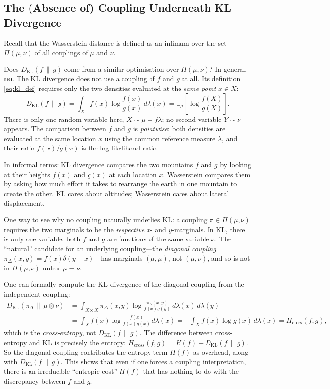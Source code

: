 \documentclass[12pt]{article}
\newcommand{\KL}[2]{D_{\mathrm{KL}}\!\left(#1\,\|\,#2\right)}
\newcommand{\E}[2]{\mathbb{E}_{#1}\!\left[#2\right]}
\begin{document}
\subsection{The (Absence of) Coupling Underneath KL Divergence}
\label{sec:kl_coupling}

Recall that the Wasserstein distance is defined as an infimum over the set $\Pi(\mu,\nu)$ of all couplings of $\mu$ and $\nu$.

Does $\KL{f}{g}$ come from a similar optimisation over
$\Pi(\mu,\nu)$?  In general, \textbf{no}.  The KL divergence
does not use a coupling of $f$ and $g$ at all.  Its definition
\eqref{eq:kl_def} requires only the two densities evaluated at
the \emph{same point} $x \in X$:
\[
  \KL{f}{g} = \int_X f(x)\log\frac{f(x)}{g(x)}\,d\lambda(x)
  = \E{\mu}{\log\frac{f(X)}{g(X)}}.
\]
There is only one random variable here, $X \sim \mu = f\lambda$;
no second variable $Y \sim \nu$ appears.  The comparison between
$f$ and $g$ is \emph{pointwise}: both densities are evaluated at
the same location $x$ using the common reference measure
$\lambda$, and their ratio $f(x)/g(x)$ is the log-likelihood
ratio.

In informal terms: KL divergence compares the two mountains $f$
and $g$ by looking at their heights $f(x)$ and $g(x)$ at each
location $x$.  Wasserstein compares them by
asking how much effort it takes to rearrange the earth in one
mountain to create the other.  KL cares about altitudes;
Wasserstein cares about lateral displacement.

One way to see why no coupling naturally underlies KL: a coupling
$\pi \in \Pi(\mu,\nu)$ requires the two marginals to be the
\emph{respective} $x$- and $y$-marginals.  In KL, there is only
one variable: both $f$ and $g$ are functions of the same
variable $x$.  The ``natural'' candidate for an underlying
coupling---the \emph{diagonal coupling} $\pi_\Delta(x,y) =
f(x)\delta(y-x)$---has marginals $(\mu, \mu)$, not $(\mu, \nu)$,
and so is not in $\Pi(\mu,\nu)$ unless $\mu = \nu$.

One can formally compute the KL divergence of the diagonal
coupling from the independent coupling:
\begin{align}\label{eq:kl_diagonal}
  \KL{\pi_\Delta}{\mu\otimes\nu}
  &= \int_{X\times X} \pi_\Delta(x,y)\log
    \frac{\pi_\Delta(x,y)}{f(x)g(y)}\,d\lambda(x)\,d\lambda(y)
  \nonumber\\
  &= \int_X f(x)\log\frac{f(x)}{f(x)g(x)}\,d\lambda(x)
  = -\int_X f(x)\log g(x)\,d\lambda(x)
  = H_{\mathrm{cross}}(f,g),
\end{align}
which is the \emph{cross-entropy}, not $\KL{f}{g}$.  The
difference between cross-entropy and KL is precisely the entropy:
$H_{\mathrm{cross}}(f,g) = H(f) + \KL{f}{g}$.  So the diagonal
coupling contributes the entropy term $H(f)$ as overhead, along
with $\KL{f}{g}$.  This shows that even if one forces a
coupling interpretation, there is an irreducible ``entropic cost''
$H(f)$ that has nothing to do with the discrepancy between $f$
and $g$.
\end{document}
